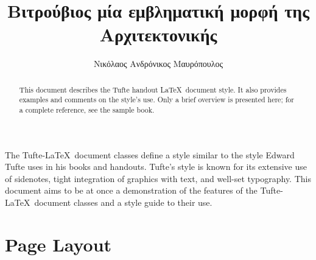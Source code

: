 \documentclass[%
              nobib,
              sfsidenotes,
              notoc,
              justified,
              a4paper,
              twoside,
              nohyper,
              ]%
              {tufte-handout}
\title{Βιτρούβιος μία εμβληματική μορφή της Αρχιτεκτονικής}
\author[Νικόλαος Ανδρόνικος Μαυρόπουλος]{Νικόλαος Ανδρόνικος Μαυρόπουλος}
\begin{document}
              
  \maketitle%
  
  
  \bigskip            
  \begin{abstract}
  \noindent This document describes the Tufte handout \LaTeX\ document style.
  It also provides examples and comments on the style's use.  Only a brief
  overview is presented here; for a complete reference, see the sample book.
  \end{abstract}
  \bigskip
              
  The Tufte-\LaTeX\ document classes \cite{dick-2007} define a style similar to the
  style Edward Tufte uses in his books and handouts.  Tufte's style is known
  for its extensive use of sidenotes, tight integration of graphics with
  text, and well-set typography.  This document aims to be at once a
  demonstration of the features of the Tufte-\LaTeX\ document classes
  and a style guide to their use.
              
  \section{Page Layout}\label{sec:page-layout}
  
  
    \printbibliography[title={Βιβλιογραφικές αναφορές}]
              
              
\end{document}
